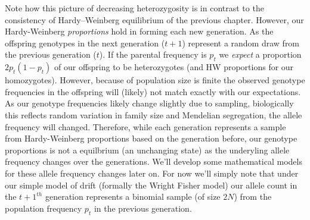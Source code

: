 Note how this picture of decreasing heterozygosity is in contrast to the
consistency of Hardy--Weinberg equilibrium of the previous chapter. 
However, our Hardy-Weinberg \emph{proportions} hold in forming each new
generation. As the offspring genotypes in the next generation ($t+1$) represent a random
draw from the previous generation ($t$). If the parental frequency is $p_t$ we
\emph{expect} a proportion $2p_t(1-p_t)$ of our offspring to be
heterozygotes (and HW proportions for our homozygotes). However, because of population size is finite the
observed genotype frequencies in the offspring will (likely) not match exactly with our
expectations. As our genotype frequencies likely change slightly due
to sampling, biologically this reflects random variation in family size
and Mendelian segregation, the allele frequency will changed. 
Therefore, while each generation represents a sample from
Hardy-Weinberg proportions based on the generation before, our
genotype proportions is not a equilbrium (an unchanging state) as the
underyling allele frequency changes over the generations. We'll develop some mathematical models for these allele
frequency changes later on. For now we'll simply note that
under our simple model of drift (formally the Wright Fisher model) our
allele count in the $t+1^{th}$ generation represents a binomial sample
(of size $2N$) from the population frequency $p_t$ in the previous
generation.  



